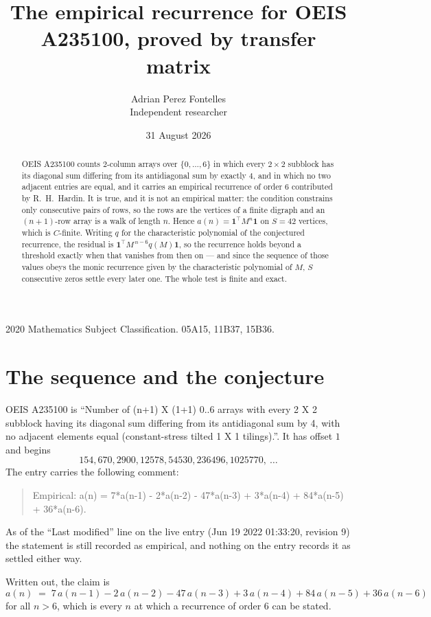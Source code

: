 \documentclass[11pt,a4paper]{article}
\title{The empirical recurrence for OEIS A235100, proved by transfer matrix}
\author{Adrian Perez Fontelles\\ \small Independent researcher}
\date{31 August 2026}
\theoremstyle{plain}
\theoremstyle{definition}
\begin{document}
\maketitle

\begin{abstract}
OEIS A235100 counts $2$-column arrays over $\{0,\dots,6\}$ in which every
$2\times2$ subblock has its diagonal sum differing from its antidiagonal sum by
exactly $4$, and in which no two adjacent entries are equal, and it
carries an empirical recurrence of order $6$ contributed by R.~H.~Hardin. It is true,
and it is not an empirical matter: the condition constrains only consecutive pairs of rows,
so the rows are the vertices of a finite digraph and an $(n+1)$-row array is a walk of
length $n$. Hence $a(n)=\mathbf{1}^{\!\top}M^{n}\mathbf{1}$ on $S=42$ vertices, which
is $C$-finite. Writing $q$ for the characteristic polynomial of the conjectured recurrence,
the residual is $\mathbf{1}^{\!\top}M^{\,n-6}q(M)\mathbf{1}$, so the recurrence
holds beyond a threshold exactly when that vanishes from then on --- and since the sequence
of those values obeys the monic recurrence given by the characteristic polynomial of $M$,
$S$ consecutive zeros settle every later one. The whole test is finite and exact.
\end{abstract}

\noindent\small 2020 Mathematics Subject Classification. 05A15, 11B37, 15B36.\normalsize

\section{The sequence and the conjecture}

OEIS A235100 is ``Number of (n+1) X (1+1) 0..6 arrays with every 2 X 2 subblock having its diagonal sum differing from its antidiagonal sum by 4, with no adjacent elements equal (constant-stress tilted 1 X 1 tilings).''. It has offset
$1$ and begins
\[
154, 670, 2900, 12578, 54530, 236496, 1025770,\ \dots
\]
The entry carries the following comment:
\begin{quote}\small
Empirical: a(n) = 7*a(n-1) - 2*a(n-2) - 47*a(n-3) + 3*a(n-4) + 84*a(n-5) + 36*a(n-6).
\end{quote}
As of the ``Last modified'' line on the live entry (Jun 19 2022 01:33:20, revision 9) the statement is
still recorded as empirical, and nothing on the entry records it as settled either way.

Written out, the claim is
\begin{equation}\label{eq:conj}
a(n)\;=\;7\,a(n-1) - 2\,a(n-2) - 47\,a(n-3) + 3\,a(n-4) + 84\,a(n-5) + 36\,a(n-6)
\end{equation}
for all $n>6$, which is every $n$ at which a recurrence of order $6$ can be
stated.
\end{document}

